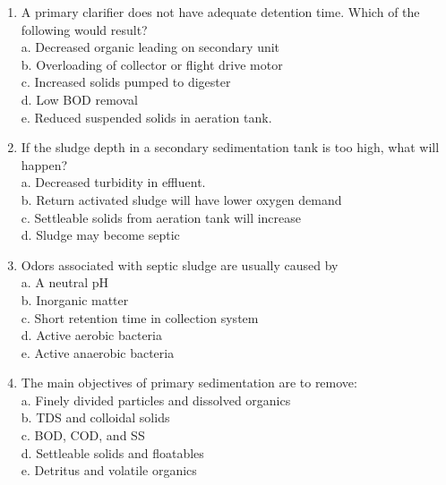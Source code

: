\begin{tcolorbox}[breakable, enhanced,
colframe=blue!25,
colback=blue!10,
coltitle=blue!20!black,  
title= Chapter Assessment]
\begin{enumerate}
a. 2 to 6 \% \\
b. 20 to 40 \% \\
c. 40 to 50 \% \\
d. 60 to 75 \% \\
e. 90 \% or better \\


\item  A primary clarifier does not have adequate detention time. Which of the following would result? \\

a. Decreased organic leading on secondary unit \\
b. Overloading of collector or flight drive motor \\
c. Increased solids pumped to digester \\
d. Low BOD removal \\
e. Reduced suspended solids in aeration tank. \\


\item  If the sludge depth in a secondary sedimentation tank is too high, what will happen? \\

a. Decreased turbidity in effluent. \\
b. Return activated sludge will have lower oxygen demand \\
c. Settleable solids from aeration tank will increase \\
d. Sludge may become septic \\


\item  Odors associated with septic sludge are usually caused by \\

a. A neutral pH \\
b. Inorganic matter \\
c. Short retention time in collection system \\
d. Active aerobic bacteria \\
e. Active anaerobic bacteria \\


\item  The main objectives of primary sedimentation are to remove: \\

a. Finely divided particles and dissolved organics \\
b. TDS and colloidal solids \\
c. BOD, COD, and SS \\
d. Settleable solids and floatables \\
e. Detritus and volatile organics \\



\end{enumerate}
\end{tcolorbox}
